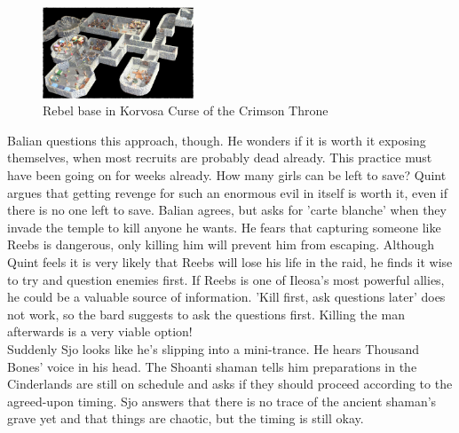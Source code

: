 \begin{figure}[h]
	\centering
	\includegraphics[width=0.4\textwidth]{images/Rebel-base-in-Korvosa-Curse-of-the-Crimson-Throne-614606623_mod.jpg}
	\caption{Rebel base in Korvosa Curse of the Crimson Throne}
	\label{fig:Rebel-base-in-Korvosa-Curse-of-the-Crimson-Throne-614606623}
\end{figure}

Balian questions this approach, though. He wonders if it is worth it exposing themselves, when most recruits are probably dead already. This practice must have been going on for weeks already. How many girls can be left to save? Quint argues that getting revenge for such an enormous evil in itself is worth it, even if there is no one left to save. Balian agrees, but asks for 'carte blanche' when they invade the temple to kill anyone he wants. He fears that capturing someone like Reebs is dangerous, only killing him will prevent him from escaping. Although Quint feels it is very likely that Reebs will lose his life in the raid, he finds it wise to try and question enemies first. If Reebs is one of Ileosa's most powerful allies, he could be a valuable source of information. 'Kill first, ask questions later' does not work, so the bard suggests to ask the questions first. Killing the man afterwards is a very viable option!\\

Suddenly Sjo looks like he's slipping into a mini-trance. He hears Thousand Bones' voice in his head. The Shoanti shaman tells him preparations in the Cinderlands are still on schedule and asks if they should proceed according to the agreed-upon timing. Sjo answers that there is no trace of the ancient shaman's grave yet and that things are chaotic, but the timing is still okay.\\


